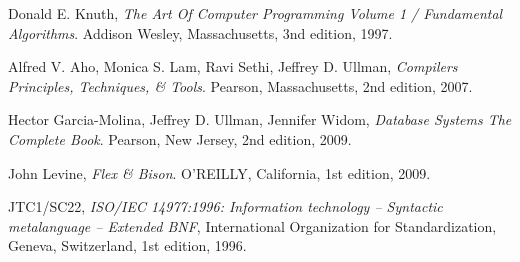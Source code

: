 
\begin{thebibliography}{50}

	Donald E. Knuth,
	\emph{The Art Of Computer Programming \small{Volume 1 / Fundamental Algorithms}}.
	Addison Wesley, Massachusetts,
	3nd edition,
	1997.
	
	Alfred V. Aho, Monica S. Lam, Ravi Sethi, Jeffrey D. Ullman,
	\emph{Compilers \small{Principles, Techniques, \& Tools}}.
	Pearson, Massachusetts,
	2nd edition,
	2007.

	Hector Garcia-Molina, Jeffrey D. Ullman, Jennifer Widom,
	\emph{Database Systems \small{The Complete Book}}.
	Pearson, New Jersey,
	2nd edition,
	2009.

	John Levine,
	\emph{Flex \& Bison}.
	O'REILLY, California,
	1st edition,
	2009.

	JTC1/SC22,
	\emph{ISO/IEC 14977:1996: Information technology -- Syntactic metalanguage -- Extended BNF},
	International Organization for Standardization, Geneva, Switzerland,
	1st edition,
	1996.
	
\end{thebibliography}

